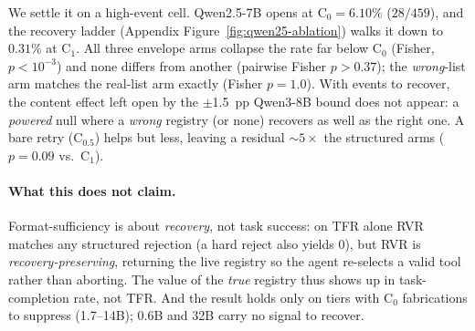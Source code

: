 We settle it on a high-event cell. Qwen2.5-7B opens at
$\mathrm{C}_0=6.10\%$ ($28/459$), and the recovery ladder
(Appendix Figure~\ref{fig:qwen25-ablation}) walks it down to $0.31\%$ at
$\mathrm{C}_1$. All three
envelope arms collapse the rate far below $\mathrm{C}_0$ (Fisher,
$p<10^{-3}$) and none differs from another (pairwise Fisher $p>0.37$);
the \emph{wrong}-list arm matches the real-list arm exactly
(Fisher $p=1.0$). With events to recover, the content effect left open by
the $\pm$1.5~pp Qwen3-8B bound does not appear: a \emph{powered} null
where a \emph{wrong} registry (or none) recovers as well as the right one.
A bare retry ($\mathrm{C}_{0.5}$) helps but less, leaving a residual
$\sim\!5\times$ the structured arms ($p=0.09$ vs.\ $\mathrm{C}_1$).


\paragraph{What this does not claim.}
Format-sufficiency is about \emph{recovery}, not task success: on TFR
alone RVR matches any structured rejection (a hard reject also yields
$0$), but RVR is \emph{recovery-preserving}, returning the live registry
so the agent re-selects a valid tool rather than aborting. The value of
the \emph{true} registry thus shows up in task-completion rate, not TFR.
And the result holds only on tiers with $\mathrm{C}_0$ fabrications to
suppress (1.7--14B); 0.6B and 32B carry no signal to recover.
